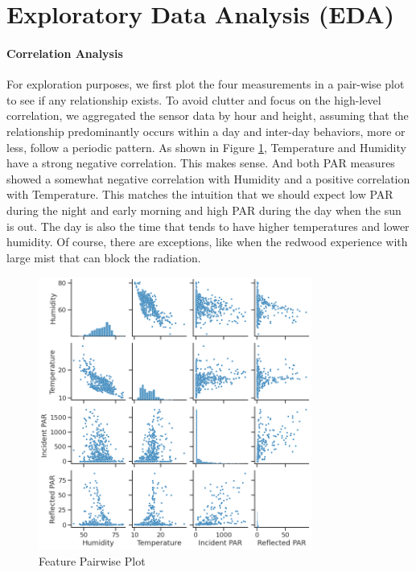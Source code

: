 \documentclass[11pt, letterpaper]{article}
\begin{document}
\section{Exploratory Data Analysis (EDA)}
\paragraph{Correlation Analysis}
For exploration purposes, we first plot the four measurements in a pair-wise plot to see if any relationship exists. To avoid clutter and focus on the high-level correlation, we aggregated the sensor data by hour and height, assuming that the relationship predominantly occurs within a day and inter-day behaviors, more or less, follow a periodic pattern. As shown in Figure \ref{fig:pairwise}, Temperature and Humidity have a strong negative correlation. This makes sense. And both PAR measures showed a somewhat negative correlation with Humidity and a positive correlation with Temperature. This matches the intuition that we should expect low PAR during the night and early morning and high PAR during the day when the sun is out. The day is also the time that tends to have higher temperatures and lower humidity. Of course, there are exceptions, like when the redwood experience with large mist that can block the radiation.
\begin{figure}[h!]
\centering
\includegraphics[width=0.8\textwidth]{eda_3.1.png}
\captionsetup{justification=centering}
\caption{Feature Pairwise Plot}
\label{fig:pairwise}
\end{figure}
\end{document}
